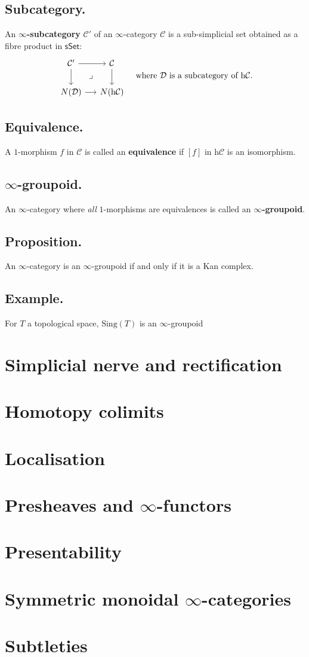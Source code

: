 \documentclass{article}
\numberwithin{equation}{subsection}
\renewcommand{\ss}[1]{\subsection{#1}}
\newcommand{\sset}{\mathsf{sSet}}
\newcommand{\C}{\mathcal{C}}
\newcommand{\h}{\mathrm{h}}
\begin{document}
        \ss{Subcategory.}
            An \textbf{$\infty$-subcategory} $\C'$ of an $\infty$-category $\C$ is a sub-simplicial set obtained as a fibre product in $\sset$:
            \[
                \begin{tikzcd}[row sep=.4em,column sep=0em]
                    \C' \ar{dd}\ar{rr} && \C \ar{dd}\\
                    &\lrcorner&\\
                    N(\mathcal{D}) \ar{rr} && N(\h\C)
                \end{tikzcd}
                \quad\text{where }\mathcal{D}\text{ is a subcategory of }\h\C.
            \]

        \ss{Equivalence.}
            A $1$-morphism $f$ in $\C$ is called an \textbf{equivalence} if $[f]$ in $\h\C$ is an isomorphism.

        \ss{$\infty$-groupoid.}
            An $\infty$-category where \emph{all} $1$-morphisms are equivalences is called an \textbf{$\infty$-groupoid}.

        \ss{Proposition.}
            An $\infty$-category is an $\infty$-groupoid if and only if it is a Kan complex.

        \ss{Example.}
            For $T$ a topological space, $\mathrm{Sing}(T)$ is an $\infty$-groupoid

    \section{Simplicial nerve and rectification}

    \section{Homotopy colimits}

    \section{Localisation}

    \section{Presheaves and $\infty$-functors}

    \section{Presentability}

    \section{Symmetric monoidal $\infty$-categories}

    \section{Subtleties}
\end{document}
